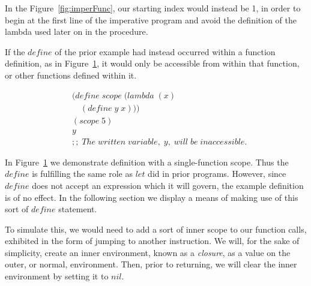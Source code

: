 In the Figure~\ref{fig:imperFunc}, our starting index would instead be 1, in
order to begin at the first line of the imperative program and avoid the
definition of the lambda used later on in the procedure.

If the $define$ of the prior example had instead occurred within a function
definition, as in Figure~\ref{fig:strictScopeExample}, it would only be
accessible from within that function, or other functions defined within it.

\begin{figure}[htp]
\caption{}\label{fig:strictScopeExample}
\begin{align*}
& (define \; scope \; (lambda \; (x)
\\& \quad (define \; y \; x)))
\\& (scope \; 5)
\\& y
\\& ;; \; The \; written \; variable, \; y, \; will \; be \; inaccessible.
\end{align*}
\end{figure}

In Figure~\ref{fig:strictScopeExample} we demonstrate definition with a
single-function scope. Thus the $define$ is fulfilling the same role as $let$
did in prior programs. However, since $define$ does not accept an expression
which it will govern, the example definition is of no effect. In the following
section we display a means of making use of this sort of $define$ statement.

To simulate this, we would need to add a sort of inner scope to our function calls, 
exhibited in the form of jumping to another instruction. We will, for the sake of
simplicity, create an inner environment, known as a \emph{closure}, as a value on the
outer, or normal, environment. Then, prior to returning, we will clear the inner 
environment by setting it to $nil$.

